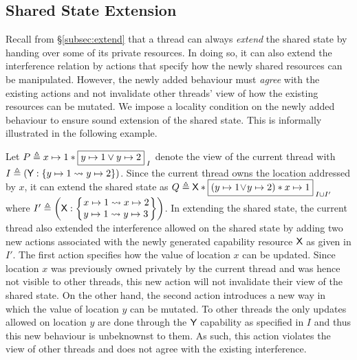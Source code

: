 \subsection{Shared State Extension}\label{subsec:extension}
Recall from \S\ref{subsec:extend} that a thread can always \emph{extend} the shared state by handing over some of its private resources. In doing so, it can also extend the interference relation by actions that specify how the newly shared resources can be manipulated. However, the newly added behaviour must \emph{agree} with the existing actions and not invalidate other threads' view of how the existing resources can be mutated. We impose a locality condition on the newly added behaviour to ensure sound extension of the shared state. This is informally illustrated in the following example. 
%
\begin{example}\label{ex:badExtension}
Let $P \triangleq x \mapsto 1 * \boxed{y \mapsto 1 \lor y \mapsto 2}_{\; I}$ denote the view of the current thread with $I \triangleq \left(\textsf{Y}: \left\{y \mapsto 1 \rightsquigarrow y \mapsto 2\right\} \right)$. Since the current thread owns the location addressed by $x$, it can extend the shared state as $Q \triangleq \textsf{X} * \boxed{\left(y \mapsto 1 \!\lor\! y \mapsto 2 \right) * x \mapsto 1}_{\; I \cup I'}$ where 
$
	I' \eqdef 
		\left(
			\token{X}: 
			\left\{
			\hspace*{-0.15cm}
			\begin{array}{l} 
				\cell{x}{1} \swap \cell{x}{2}\\
				\cell{y}{1} \swap \cell{y}{3}
			\end{array}
			\hspace*{-0.15cm}
			\right\}
		 \right)
$.
In extending the shared state, the current thread also extended the interference allowed on the shared state by adding two new actions associated with the newly generated capability resource $\textsf{X}$ as given in $I'$. The first action specifies how the value of location $x$ can be updated. Since location $x$ was previously owned privately by the current thread and was hence not visible to other threads, this new action will not invalidate their view of the shared state. On the other hand, the second action introduces a new way in which the value of location $y$ can be mutated. To other threads the only updates allowed on location $y$ are done through the $\textsf{Y}$ capability as specified in $I$ and thus this new behaviour is unbeknownst to them. As such, this action violates the view of other threads and does not agree with the existing interference.
\end{example}
